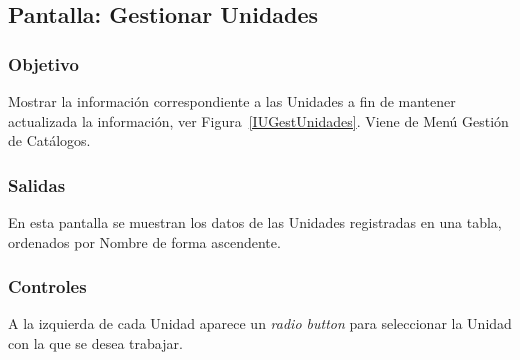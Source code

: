 \subsection{Pantalla: Gestionar Unidades}

\subsubsection{Objetivo}
	Mostrar la información correspondiente a las Unidades a fin de mantener actualizada la información, ver Figura~\ref{IUGestUnidades}. Viene de Menú Gestión de Catálogos.


\subsubsection{Salidas}

	En esta pantalla se muestran los datos de las Unidades registradas en una tabla, ordenados por Nombre de forma ascendente.

\subsubsection{Controles}

	A la izquierda de cada Unidad aparece un {\em radio button} para seleccionar la Unidad con la que se desea trabajar.
	

